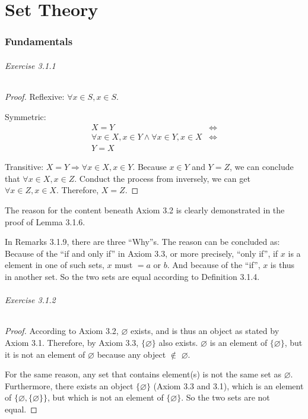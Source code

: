 \part{Set Theory}

\section{Fundamentals}
\paragraph{Exercise 3.1.1} \label{exercise3.1.1}
\begin{proof}
Reflexive: $\forall x \in S, x \in S$.

Symmetric: 
\begin{align*}
X = Y
&\Longleftrightarrow \\
\forall x \in X, x \in Y \wedge \forall x \in Y, x \in X
&\Longleftrightarrow \\
Y = X
\end{align*}

Transitive:
$X=Y \Longrightarrow \forall x \in X, x \in Y$. Because $x \in Y$ and $Y = Z$, we can conclude that 
$\forall x \in X, x \in Z$. Conduct the process from inversely, we can get $\forall x \in Z, x \in X$. 
Therefore, $X=Z$.
\end{proof}

The reason for the content beneath Axiom 3.2 is clearly demonstrated in the proof of Lemma 3.1.6.

In Remarks 3.1.9, there are three ``Why''s. The reason can be concluded as: Because of the ``if and only 
if'' in Axiom 3.3, or more precisely, ``only if'', if $x$ is a element in one of such sets, $x$ must 
$=a$ or $b$. And because of the ``if'', $x$ is thus in another set. So the two sets are equal according 
to Definition 3.1.4.

\paragraph{Exercise 3.1.2} \label{exercise3.1.2}
\begin{proof}
According to Axiom 3.2, $\varnothing$ exists, and is thus an object as stated by Axiom 3.1. Therefore, 
by Axiom 3.3, $\{\varnothing\}$ also exists. $\varnothing$ is an element of $\{\varnothing\}$, but it 
is not an element of $\varnothing$ because any object $\notin$ $\varnothing$.

For the same reason, any set that contains element(s) is not the same set as $\varnothing$. Furthermore, 
there exists an object $\{\varnothing\}$ (Axiom 3.3 and 3.1), which is an element of 
$\{\varnothing, \{\varnothing\}\}$, but which is not an element of $\{\varnothing\}$. So the two sets 
are not equal.
\end{proof}

